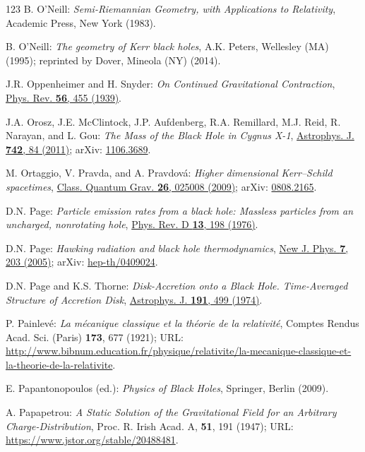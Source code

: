 \begin{thebibliography}{123}
B. O'Neill: {\em Semi-Riemannian Geometry, with Applications to Relativity},
Academic Press, New York (1983).

B. O'Neill: {\em The geometry of Kerr black holes}, A.K. Peters, Wellesley (MA) (1995);
reprinted by Dover, Mineola (NY) (2014).

J.R. Oppenheimer and H. Snyder:
{\em On Continued Gravitational Contraction},
\href{https://doi.org/10.1103/PhysRev.56.455}{Phys. Rev. {\bf 56}, 455 (1939)}.

J.A. Orosz, J.E. McClintock, J.P. Aufdenberg, R.A. Remillard, M.J. Reid, R. Narayan, and L. Gou:
{\em The Mass of the Black Hole in Cygnus X-1},
\href{https://doi.org/10.1088/0004-637X/742/2/84}{Astrophys. J. {\bf 742}, 84 (2011)};
arXiv: \href{https://arxiv.org/abs/1106.3689}{1106.3689}.

M. Ortaggio, V. Pravda, and A. Pravdová:
{\em Higher dimensional Kerr–Schild spacetimes},
\href{https://doi.org/10.1088/0264-9381/26/2/025008}{Class. Quantum Grav. {\bf 26}, 025008 (2009)};
arXiv: \href{https://arxiv.org/abs/0808.2165}{0808.2165}.

D.N. Page:
{\em Particle emission rates from a black hole: Massless particles from an uncharged, nonrotating hole},
\href{https://doi.org/10.1103/PhysRevD.13.198}{Phys. Rev. D {\bf 13}, 198 (1976)}.

D.N. Page:
{\em Hawking radiation and black hole thermodynamics},
\href{https://doi.org/10.1088/1367-2630/7/1/203}{New J. Phys. {\bf 7}, 203 (2005)};
arXiv: \href{https://arxiv.org/abs/hep-th/0409024}{hep-th/0409024}.

D.N. Page and K.S. Thorne:
{\em Disk-Accretion onto a Black Hole. Time-Averaged Structure of Accretion Disk},
\href{https://doi.org/10.1086/152990}{Astrophys. J. {\bf 191}, 499 (1974)}.

P. Painlevé: \emph{La mécanique classique et la théorie de la relativité},
Comptes Rendus Acad. Sci. (Paris) {\bf 173}, 677 (1921);
URL: \url{http://www.bibnum.education.fr/physique/relativite/la-mecanique-classique-et-la-theorie-de-la-relativite}.

E. Papantonopoulos (ed.): {\em Physics of Black Holes}, Springer, Berlin (2009).

A. Papapetrou:
{\em A Static Solution of the Gravitational Field for an Arbitrary Charge-Distribution},
Proc. R. Irish Acad. A, {\bf 51}, 191 (1947);
URL: \url{https://www.jstor.org/stable/20488481}.


\end{thebibliography}
